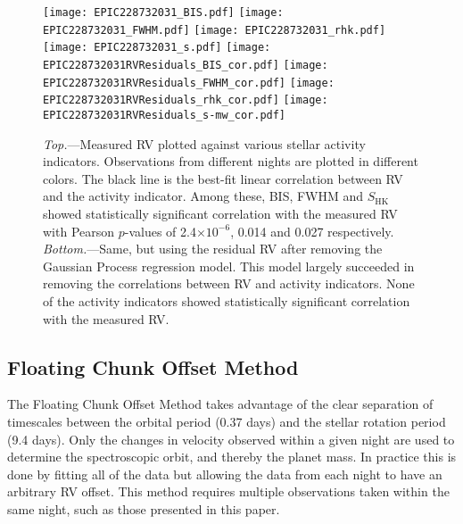 \documentclass[twocolumn]{aastex61}
\begin{document}
\begin{figure*}
\begin{center}
\texttt{[image: EPIC228732031\_BIS.pdf]}
\texttt{[image: EPIC228732031\_FWHM.pdf]}
\texttt{[image: EPIC228732031\_rhk.pdf]}
\texttt{[image: EPIC228732031\_s.pdf]}
\texttt{[image: EPIC228732031RVResiduals\_BIS\_cor.pdf]}
\texttt{[image: EPIC228732031RVResiduals\_FWHM\_cor.pdf]}
\texttt{[image: EPIC228732031RVResiduals\_rhk\_cor.pdf]}
\texttt{[image: EPIC228732031RVResiduals\_s-mw\_cor.pdf]}

\caption{{\it Top.}---Measured RV plotted against various stellar activity indicators. Observations from different nights are plotted in different colors. The black line is the best-fit linear correlation between RV and the activity indicator. Among these, BIS, FWHM and $S_{\text{HK}}$ showed statistically significant correlation with the measured RV with Pearson $p$-values of 2.4$\times 10^{-6}$, 0.014 and 0.027 respectively. {\it Bottom.}---Same, but using the residual RV
after removing the Gaussian Process regression model. This model largely succeeded in removing the correlations between RV and activity indicators. None of the activity indicators showed statistically significant correlation with the measured RV.}
\label{correlations}
\end{center}
\end{figure*}

\subsection{Floating Chunk Offset Method}

The Floating Chunk Offset Method \citep[see, e.g.,][]{Hatzes2011} takes advantage of the clear separation of timescales between the orbital period (0.37 days) and the stellar rotation period (9.4 days). Only the changes in velocity observed within a given night are used to determine the spectroscopic
orbit, and thereby the planet mass. In practice this is done by
fitting all of the data but allowing the data from each night to have
an arbitrary RV offset. This method requires multiple observations taken within the same night, such as those presented in this paper. 
\end{document}
